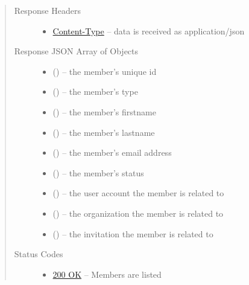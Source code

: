 \documentclass[letterpaper,10pt,english]{sphinxmanual}
\begin{document}
\begin{fulllineitems}
\begin{quote}
\begin{description}
\begin{itemize}
\end{itemize}

\item[{Response Headers}] \leavevmode\begin{itemize}
\item {} 
\href{http://tools.ietf.org/html/rfc7231\#section-3.1.1.5}{Content-Type} -- data is received as application/json

\end{itemize}

\item[{Response JSON Array of Objects}] \leavevmode\begin{itemize}
\item {} 
 () -- the member's unique id

\item {} 
 () -- the member's type

\item {} 
 () -- the member's firstname

\item {} 
 () -- the member's lastname

\item {} 
 () -- the member's email address

\item {} 
 () -- the member's status

\item {} 
 () -- the user account the member is related to

\item {} 
 () -- the organization the member is
related to

\item {} 
 () -- the invitation the member is related to

\end{itemize}

\item[{Status Codes}] \leavevmode\begin{itemize}
\item {} 
\href{http://www.w3.org/Protocols/rfc2616/rfc2616-sec10.html\#sec10.2.1}{200 OK} -- Members are listed


\end{itemize}
\end{description}
\end{quote}
\end{fulllineitems}
\end{document}
